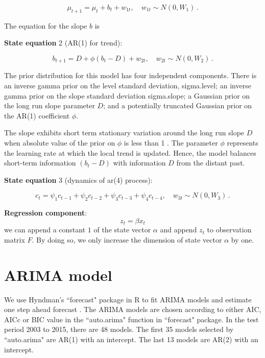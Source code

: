 $$\mu_{t+1} = \mu_{t} + b_{t} +  w_{1t}, \quad w_{1t} \sim N(0, W_{1}) \, .$$



The equation for the slope $b$  is



\textbf{State equation} 2 (AR(1) for trend):  



$$b_{t+1} = D + \phi  (b_t - D) + w_{2t}, \quad w_{2t} \sim N(0, W_{2}) \, .$$



The prior distribution for this model has four independent components. There is an inverse gamma prior on the level standard deviation, sigma.level; an inverse gamma prior on the slope standard deviation sigma.slope; a Gaussian prior on the long run slope parameter $D$; and a potentially truncated Gaussian prior on the AR(1) coefficient $\phi$. 

The slope exhibits short term stationary variation around the long run slope $D$ when absolute value of the prior on  $\phi$ is less than 1  \cite{Scott2015}. The parameter  $\phi$ represents the learning rate at which the local trend is updated. Hence, the model balances short-term information $(b_t - D)$  with information $D$ from the distant past.


\textbf{State equation} 3 (dynamics of ar(4) process):  


$$c_t = \psi_1 c_{t-1} + \psi_2 c_{t-2} +\psi_3 c_{t-3} +\psi_4 c_{t-4}, \quad w_{3t} \sim N(0, W_{3}) \, .$$

\textbf{Regression component}: $$z_t = \beta x_t$$ 
we can append a constant $1$ of the state vector $\alpha$ and append $z_t$ to observation matrix $F$. By doing so, we only increase the dimension of state vector $\alpha$ by one. 






\section{ARIMA model}
\label{sec:arima}

We use  Hyndman's ``forecast" package in R to fit ARIMA models and estimate one step ahead forecast \cite{Hyndman2015}. The ARIMA models are chosen according to either AIC, AICc or BIC value in the ``auto.arima" function in ``forecast" package. In the test period 2003 to 2015, there are 48 models. The first 35 models selected by ``auto.arima" are AR(1) with an intercept. The last 13 models are AR(2) with an intercept. 

